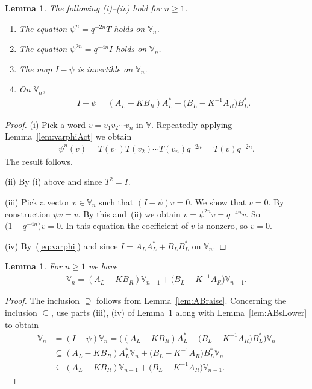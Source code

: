 \documentclass[pdftex]{sigma}
\numberwithin{equation}{section}
\newtheorem{Lemma}[Theorem]{Lemma}
\begin{document}
\begin{Lemma}\label{lem:spam} The following {\rm (i)--(iv)} hold for $n\geq 1$.
\begin{enumerate}\itemsep=0pt
\item[\rm (i)]
The equation
$\psi^n = q^{-2n} T$ holds
on $\mathbb V_n$.
\item[\rm (ii)] The equation
$\psi^{2n} = q^{-4n} I$ holds
on $\mathbb V_n$.
\item[\rm (iii)]
The map $I-\psi$ is invertible on $\mathbb V_n$.
\item[\rm (iv)] On $\mathbb V_n$,
\begin{gather*}
I-\psi= (A_L-K B_R)A^*_L +\big(B_L-K^{-1} A_R\big)B^*_L.
\end{gather*}
\end{enumerate}
\end{Lemma}
\begin{proof} (i) Pick a word $v=v_1v_2 \cdots v_n$ in $\mathbb V$. Repeatedly applying Lemma~\ref{lem:varphiAct} we obtain
\begin{gather*}
\psi^n(v) = T(v_1) T(v_2) \cdots T(v_n) q^{-2n} = T(v) q^{-2n}.
\end{gather*}
The result follows.

(ii) By (i) above and since $T^2=I$.

(iii) Pick a vector $v\in \mathbb V_n$ such that $(I-\psi)v=0$. We show that $v=0$. By construction $\psi v = v$. By this and~(ii) we obtain $v=\psi^{2n}v = q^{-4n} v$. So $\big(1-q^{-4n}\big)v=0$. In this equation the coefficient of $v$ is nonzero, so $v=0$.

(iv) By~(\ref{eq:varphi}) and since $I = A_L A^*_L + B_L B^*_L$ on $\mathbb V_n$.
\end{proof}

\begin{Lemma}\label{lem:span} For $n\geq 1$ we have
\begin{gather*}
\mathbb V_n = (A_L - K B_R)\mathbb V_{n-1} + \big(B_L-K^{-1} A_R\big)\mathbb V_{n-1}.%
\end{gather*}
\end{Lemma}
\begin{proof}The inclusion $\supseteq $ follows from Lemma~\ref{lem:ABraise}. Concerning the inclusion $\subseteq$, use parts (iii), (iv) of Lemma~\ref{lem:spam} along with Lemma~\ref{lem:ABsLower} to obtain
\begin{align*}
\mathbb V_n &= (I-\psi)\mathbb V_n =\bigl((A_L-K B_R)A^*_L+ \big(B_L-K^{-1} A_R\big)B^*_L\bigr) \mathbb V_n\\
&\subseteq(A_L-K B_R)A^*_L \mathbb V_n + \big(B_L-K^{-1} A_R\big)B^*_L\mathbb V_n\\
&\subseteq (A_L-K B_R) \mathbb V_{n-1}+ \big(B_L-K^{-1} A_R\big) \mathbb V_{n-1}.\tag*{\qed}
\end{align*}\renewcommand{\qed}{}
\end{proof}
\end{document}
